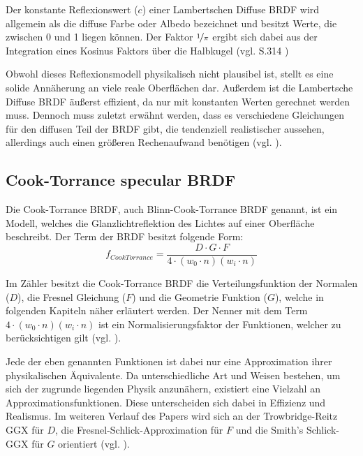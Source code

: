 \documentclass[
  11pt,
  a4paper,
  oneside
  ]{article}
\begin{document}
Der konstante Reflexionswert ($c$) einer Lambertschen Diffuse BRDF wird allgemein als die diffuse Farbe oder Albedo bezeichnet und besitzt Werte, die zwischen 0 und 1 liegen können. Der Faktor $\nicefrac{1}{\pi}$ ergibt sich dabei aus der Integration eines Kosinus Faktors über die Halbkugel 
(vgl. S.314 \cite{realTimeRendering4th})

Obwohl dieses Reflexionsmodell physikalisch nicht plausibel ist, stellt es eine solide Annäherung an viele reale Oberflächen dar. Außerdem ist die Lambertsche Diffuse BRDF äußerst effizient, da nur mit konstanten Werten gerechnet werden muss. Dennoch muss zuletzt erwähnt werden, dass es verschiedene Gleichungen für den diffusen Teil der BRDF gibt, die tendenziell realistischer aussehen, allerdings auch einen größeren Rechenaufwand benötigen (vgl. \cite{learnOpenGL}).
\subsection{Cook-Torrance specular BRDF}
Die Cook-Torrance BRDF, auch Blinn-Cook-Torrance BRDF genannt, ist ein Modell, welches die Glanzlichtreflektion des Lichtes auf einer Oberfläche beschreibt. Der Term der BRDF besitzt folgende Form: 
\begin{equation}
  f_{CookTorrance}=\dfrac{D\cdot G\cdot F}{4\cdot \left( w_{0}\cdot n\right) \left( w_{i}\cdot n\right) }
\end{equation}

Im Zähler besitzt die Cook-Torrance BRDF die Verteilungsfunktion der Normalen ($D$), die Fresnel Gleichung ($F$) und die Geometrie Funktion ($G$), welche in folgenden Kapiteln näher erläutert werden.  Der Nenner mit dem Term $4\cdot \left( w_{0}\cdot n\right) \left( w_{i}\cdot n\right)$ ist ein Normalisierungsfaktor der Funktionen, welcher zu berücksichtigen gilt (vgl. \cite{learnOpenGL}).

Jede der eben genannten Funktionen ist dabei nur eine Approximation ihrer physikalischen Äquivalente. Da unterschiedliche Art und Weisen bestehen, um sich der zugrunde liegenden Physik anzunähern, existiert eine Vielzahl an Approximationsfunktionen. Diese unterscheiden sich dabei in Effizienz und Realismus. Im weiteren Verlauf des Papers wird sich an der Trowbridge-Reitz GGX für $D$, die Fresnel-Schlick-Approximation für $F$ und die Smith's Schlick-GGX für $G$ orientiert 
(vgl. \cite{learnOpenGL}).
\end{document}
